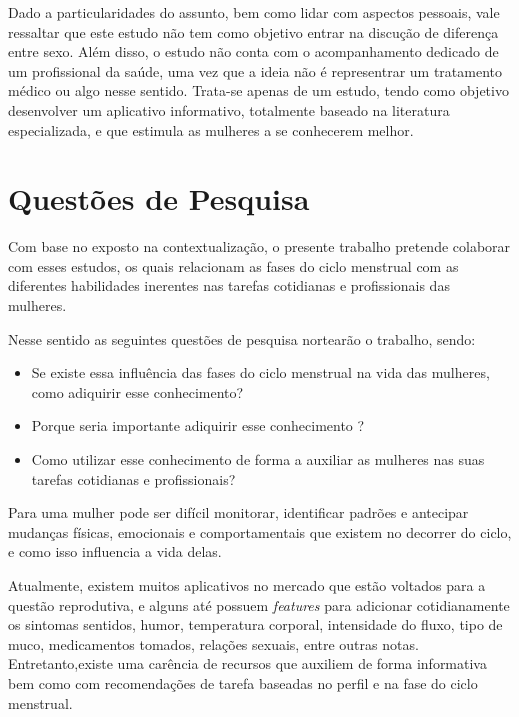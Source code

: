 Dado a particularidades do assunto, bem como lidar com aspectos pessoais, vale ressaltar que este estudo não tem como objetivo entrar na discução de diferença entre sexo. Além disso, o estudo não conta com o acompanhamento dedicado de um profissional da saúde, uma vez que a ideia não é representrar um tratamento médico ou algo nesse sentido. Trata-se apenas de um estudo, tendo como objetivo desenvolver um aplicativo informativo, totalmente baseado na literatura especializada, e que estimula as mulheres a se conhecerem melhor. 

\section*{Questões de Pesquisa}

Com base no exposto na contextualização, o presente trabalho pretende colaborar com esses estudos, os quais relacionam as fases do ciclo menstrual com as diferentes habilidades inerentes nas tarefas cotidianas e profissionais das mulheres.

Nesse sentido as seguintes questões de pesquisa nortearão o trabalho, sendo:

\begin{itemize}

        \item Se existe essa influência das fases do ciclo menstrual na vida das mulheres, como adiquirir esse conhecimento?

        \item Porque seria importante adiquirir esse conhecimento ? 

        \item Como utilizar esse conhecimento de forma a auxiliar as mulheres nas suas tarefas cotidianas e profissionais?

\end{itemize}

Para uma mulher pode ser difícil monitorar, identificar padrões e antecipar mudanças físicas, emocionais e comportamentais que existem no decorrer do ciclo, e como isso influencia a vida delas.

Atualmente, existem muitos aplicativos no mercado que estão voltados para a questão reprodutiva, e alguns até possuem \textit{features} para adicionar cotidianamente os sintomas sentidos, humor, temperatura corporal, intensidade do fluxo, tipo de muco, medicamentos tomados, relações sexuais, entre outras notas. Entretanto,existe uma carência de recursos que auxiliem de forma informativa bem como com recomendações de tarefa baseadas no perfil e na fase do ciclo menstrual.

